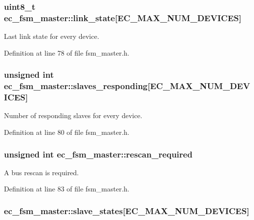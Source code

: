 \subsubsection[{link\-\_\-state}]{\setlength{\rightskip}{0pt plus 5cm}uint8\-\_\-t {\bf ec\-\_\-fsm\-\_\-master\-::link\-\_\-state}[\-E\-C\-\_\-\-M\-A\-X\-\_\-\-N\-U\-M\-\_\-\-D\-E\-V\-I\-C\-E\-S]}\label{structec__fsm__master_a6b0de3d8e619c6937679b6e746dd3c1f}


\-Last link state for every device. 



\-Definition at line 78 of file fsm\-\_\-master.\-h.

\subsubsection[{slaves\-\_\-responding}]{\setlength{\rightskip}{0pt plus 5cm}unsigned int {\bf ec\-\_\-fsm\-\_\-master\-::slaves\-\_\-responding}[\-E\-C\-\_\-\-M\-A\-X\-\_\-\-N\-U\-M\-\_\-\-D\-E\-V\-I\-C\-E\-S]}\label{structec__fsm__master_a0e6fafb6571a8c72ef75d37b335f168c}


\-Number of responding slaves for every device. 



\-Definition at line 80 of file fsm\-\_\-master.\-h.

\subsubsection[{rescan\-\_\-required}]{\setlength{\rightskip}{0pt plus 5cm}unsigned int {\bf ec\-\_\-fsm\-\_\-master\-::rescan\-\_\-required}}\label{structec__fsm__master_a173d3201cbfb35d29ff02788d7396839}


\-A bus rescan is required. 



\-Definition at line 83 of file fsm\-\_\-master.\-h.

\subsubsection[{slave\-\_\-states}]{ {\bf ec\-\_\-fsm\-\_\-master\-::slave\-\_\-states}[\-E\-C\-\_\-\-M\-A\-X\-\_\-\-N\-U\-M\-\_\-\-D\-E\-V\-I\-C\-E\-S]}\label{structec__fsm__master_a76906b5cbaec1d07e5881738a6ce008e}


